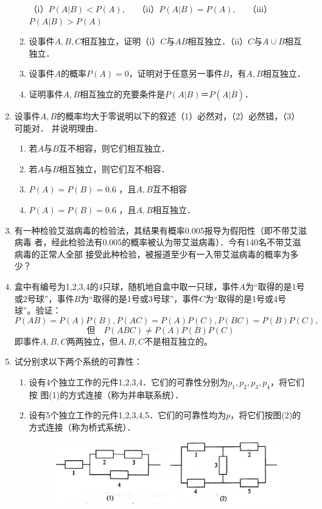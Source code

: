 \documentclass[10pt,a4paper]{article}
\begin{document}
\begin{enumerate}
\begin{enumerate}
        （i）$P(A|B)<P(A),\quad$ （ii）$P(A|B)=P(A),\quad$ （iii）$P(A|B)>P(A)$
        \item 设事件$A,B,C$相互独立，证明（i）$C$与$AB$相互独立．（ii）$C$与$A\cup B$相互独立．
        \item 设事件$A$的概率$P(A)=0$，证明对于任意另一事件$B$，有$A,B$相互独立．
        \item 证明事件$A,B$相互独立的充要条件是$P(A|B)＝P(A|\overline{B})$．
    \end{enumerate}



    \item 设事件$A,B$的概率均大于零说明以下的叙述（1）必然对，（2）必然错，（3）可能对．
    并说明理由．
    \begin{enumerate}
        \item 若$A$与$B$互不相容，则它们相互独立．
        \item 若$A$与$B$相互独立，则它们互不相容．
        \item $P(A)=P(B)=0.6$ ，且$A,B$互不相容
        \item $P(A)=P(B)=0.6$ ，且$A,B$相互独立．
    \end{enumerate}


    \item 有一种检验艾滋病毒的检验法，其结果有概率0.005报导为假阳性（即不带艾滋病毒
    者，经此检验法有0.005的概率被认为带艾滋病毒）．今有140名不带艾滋病毒的正常人全部
    接受此种检验，被报道至少有一入带艾滋病毒的概率为多少？


    \item 盒中有编号为1,2,3,4的4只球，随机地自盒中取一只球，事件$A$为“取得的是1号
    或2号球”，事件$B$为“取得的是1号或3号球”，事件$C$为“取得的是1号或4号球”。验证：
    $$P(AB)=P(A)P(B),P(AC)=P(A)P(C),P(BC)=P(B)P(C),$$
    $$\mbox{但}\quad P(ABC)\neq P(A)P(B)P(C)$$
    即事件$A,B,C$两两独立，但$A,B,C$不是相互独立的。
    

    \item 试分别求以下两个系统的可靠性：
    \begin{enumerate}
        \item 设有4个独立工作的元件1,2,3,4．它们的可靠性分别为$p_1,p_2,p_3,p_4$，将它们按
        图(1)的方式连接（称为并串联系统）．
        \item 设有5个独立工作的元件1,2,3,4,5．它们的可靠性均为$p$，将它们按图(2)的
        方式连接（称为桥式系统）．
        \begin{figure}[h]
        \centering
        \includegraphics[scale=0.2]{1.34.jpg}
        \end{figure}
        \vspace{-0.5cm}
    \end{enumerate}



\end{enumerate}
\end{document}
